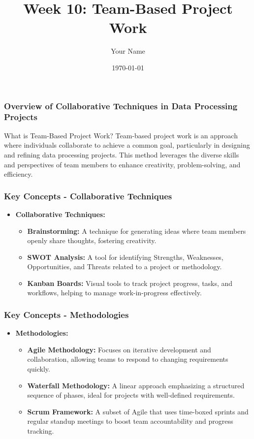 \documentclass{beamer}
\title{Week 10: Team-Based Project Work}
\author{Your Name}
\institute{Your Institution}
\date{\today}
\begin{document}
\frame{\titlepage}

\begin{frame}[fragile]
    \titlepage
\end{frame}

\begin{frame}[fragile]
    \frametitle{Overview of Collaborative Techniques in Data Processing Projects}
    \begin{block}{What is Team-Based Project Work?}
        Team-based project work is an approach where individuals collaborate to achieve a common goal, particularly in designing and refining data processing projects. 
        This method leverages the diverse skills and perspectives of team members to enhance creativity, problem-solving, and efficiency.
    \end{block}
\end{frame}

\begin{frame}[fragile]
    \frametitle{Key Concepts - Collaborative Techniques}
    \begin{itemize}
        \item \textbf{Collaborative Techniques:}
        \begin{itemize}
            \item \textbf{Brainstorming:} A technique for generating ideas where team members openly share thoughts, fostering creativity.
            \item \textbf{SWOT Analysis:} A tool for identifying Strengths, Weaknesses, Opportunities, and Threats related to a project or methodology.
            \item \textbf{Kanban Boards:} Visual tools to track project progress, tasks, and workflows, helping to manage work-in-progress effectively.
        \end{itemize}
    \end{itemize}
\end{frame}

\begin{frame}[fragile]
    \frametitle{Key Concepts - Methodologies}
    \begin{itemize}
        \item \textbf{Methodologies:}
        \begin{itemize}
            \item \textbf{Agile Methodology:} Focuses on iterative development and collaboration, allowing teams to respond to changing requirements quickly.
            \item \textbf{Waterfall Methodology:} A linear approach emphasizing a structured sequence of phases, ideal for projects with well-defined requirements.
            \item \textbf{Scrum Framework:} A subset of Agile that uses time-boxed sprints and regular standup meetings to boost team accountability and progress tracking.
        \end{itemize}
    \end{itemize}
\end{frame}
\end{document}

